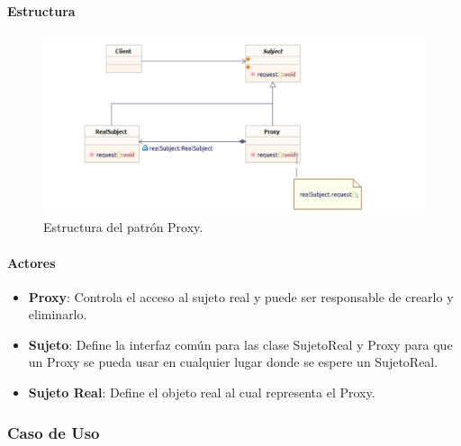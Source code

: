 \paragraph{Estructura}

\begin{figure}[th!]
	\centering
	\includegraphics[width=.7\linewidth]{imagenes/Patrones/estructura_Proxy.pdf}
	\caption{Estructura del patrón Proxy.\cite{gof}}	
\end{figure}

\paragraph{Actores}

\begin{itemize}
	\item \textbf{Proxy}: Controla el acceso al sujeto real y puede ser responsable de crearlo y eliminarlo.
	\item \textbf{Sujeto}: Define la interfaz común para las clase SujetoReal y Proxy para que un Proxy se pueda usar en cualquier lugar donde se espere un SujetoReal.
	\item \textbf{Sujeto Real}: Define el objeto real al cual representa el Proxy.
\end{itemize}


\subsubsection{Caso de Uso}


